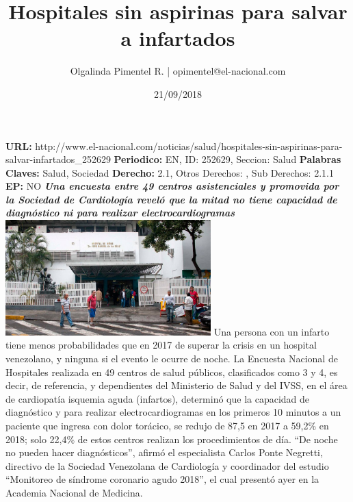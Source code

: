 \documentclass{article}%
\title{\textbf{Hospitales sin aspirinas para salvar a infartados}}%
\author{Olgalinda Pimentel R. | opimentel@el{-}nacional.com}%
\date{21/09/2018}%
\begin{document}
%
\normalsize%
\maketitle%
\textbf{URL: }%
http://www.el{-}nacional.com/noticias/salud/hospitales{-}sin{-}aspirinas{-}para{-}salvar{-}infartados\_252629\newline%
%
\textbf{Periodico: }%
EN, %
ID: %
252629, %
Seccion: %
Salud\newline%
%
\textbf{Palabras Claves: }%
Salud, Sociedad\newline%
%
\textbf{Derecho: }%
2.1, %
Otros Derechos: %
, %
Sub Derechos: %
2.1.1\newline%
%
\textbf{EP: }%
NO\newline%
\newline%
%
\textbf{\textit{Una encuesta entre 49 centros asistenciales y promovida por la Sociedad de Cardiología reveló que la mitad no tiene capacidad de diagnóstico ni para realizar electrocardiogramas}}%
\newline%
\newline%
%
\includegraphics[width=300px]{239.jpg}%
\newline%
%
Una persona con un infarto tiene menos probabilidades que en 2017 de superar la crisis en un hospital venezolano, y ninguna si el evento le ocurre de noche.%
\newline%
%
La Encuesta Nacional de Hospitales realizada en 49 centros de salud públicos, clasificados como 3 y 4, es decir, de referencia, y dependientes del Ministerio de Salud y del IVSS, en el área de cardiopatía isquemia aguda (infartos), determinó que la capacidad de diagnóstico y para realizar electrocardiogramas en los primeros 10 minutos a un paciente que ingresa con dolor torácico, se redujo de 87,5 en 2017 a 59,2\% en 2018; solo 22,4\% de estos centros realizan los procedimientos de día. “De noche no pueden hacer diagnósticos”, afirmó el especialista Carlos Ponte Negretti, directivo de la Sociedad Venezolana de Cardiología y coordinador del estudio “Monitoreo de síndrome coronario agudo 2018”, el cual presentó ayer en la Academia Nacional de Medicina.%
\end{document}
